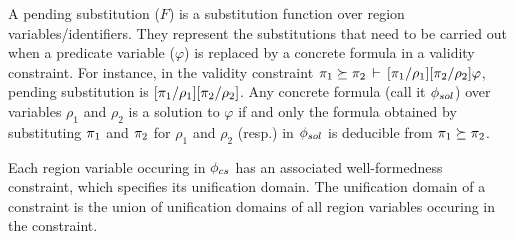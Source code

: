 A pending substitution ($F$) is a substitution function over region
variables/identifiers. They represent the substitutions that need to
be carried out when a predicate variable ($\varphi$) is replaced by a
concrete formula in a validity constraint. For instance, in the
validity constraint $\pi_1 \succeq
\pi_2\,\vdash\,[\pi_1/\rho_1][\pi_2/\rho_2]\varphi$, pending substitution
is $[\pi_1/\rho_1][\pi_2/\rho_2]$. Any concrete formula (call it
$\phi_{sol}$) over variables $\rho_1$ and $\rho_2$ is a solution to
$\varphi$ if and only the formula obtained by substituting $\pi_1$
and $\pi_2$ for $\rho_1$ and $\rho_2$ (resp.) in $\phi_{sol}$ is
deducible from $\pi_1 \succeq \pi_2$.


%
%

Each region variable occuring in $\phi_{cs}$ has an associated well-formedness
constraint, which specifies its unification domain. The unification domain of a
constraint is the union of unification domains of all region variables
occuring in the constraint.

